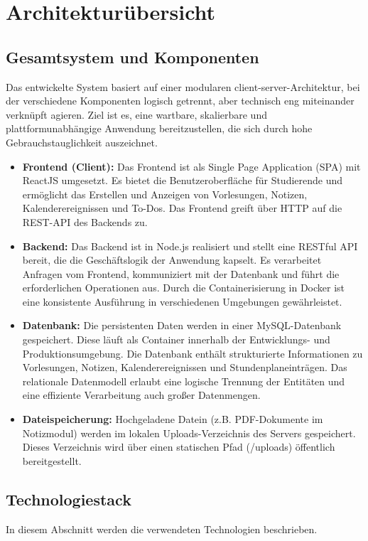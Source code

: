 \chapter{Architekturübersicht}
\section{Gesamtsystem und Komponenten}
Das entwickelte System basiert auf einer modularen client-server-Architektur, bei der verschiedene Komponenten logisch getrennt, aber technisch eng miteinander verknüpft agieren. Ziel ist es, eine wartbare, skalierbare und plattformunabhängige Anwendung bereitzustellen, die sich durch hohe Gebrauchstauglichkeit auszeichnet.
\begin{itemize}
    \item \textbf{Frontend (Client):} Das Frontend ist als Single Page Application (SPA) mit ReactJS umgesetzt. Es bietet die Benutzeroberfläche für Studierende und ermöglicht das Erstellen und Anzeigen von Vorlesungen, Notizen, Kalenderereignissen und To-Dos. Das Frontend greift über HTTP auf die REST-API des Backends zu.
    \item \textbf{Backend:} Das Backend ist in Node.js realisiert und stellt eine RESTful API bereit, die die Geschäftslogik der Anwendung kapselt. Es verarbeitet Anfragen vom Frontend, kommuniziert mit der Datenbank und führt die erforderlichen Operationen aus. Durch die Containerisierung in Docker ist eine konsistente Ausführung in verschiedenen Umgebungen gewährleistet.
    \item \textbf{Datenbank:} Die persistenten Daten werden in einer MySQL-Datenbank gespeichert. Diese läuft als Container innerhalb der Entwicklungs- und Produktionsumgebung. Die Datenbank enthält strukturierte Informationen zu Vorlesungen, Notizen, Kalenderereignissen und Stundenplaneinträgen. Das relationale Datenmodell erlaubt eine logische Trennung der Entitäten und eine effiziente Verarbeitung auch großer Datenmengen.
    \item \textbf{Dateispeicherung:} Hochgeladene Datein (z.B. PDF-Dokumente im Notizmodul) werden im lokalen Uploads-Verzeichnis des Servers gespeichert. Dieses Verzeichnis wird über einen statischen Pfad (/uploads) öffentlich bereitgestellt.
\end{itemize}
\section{Technologiestack}
In diesem Abschnitt werden die verwendeten Technologien beschrieben.
